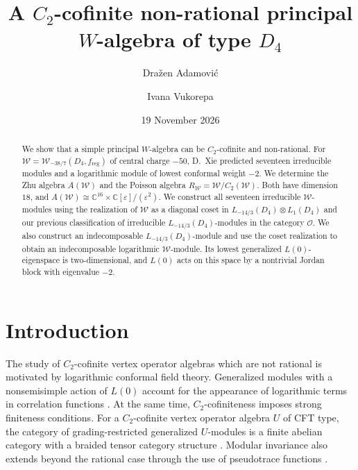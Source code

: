 \documentclass[11pt]{amsart}
\date{19 November 2026}
\title{A $C_2$-cofinite non-rational principal\\
 $W$-algebra of type $D_4$}
\author[]{Dra\v zen  Adamovi\' c}
\author[]{Ivana Vukorepa}
\numberwithin{equation}{section}
\theoremstyle{definition}
\theoremstyle{remark}
\newcommand{\CC}{\mathbb C}
\begin{document}
\begin{abstract}
We show that a simple principal $W$-algebra can be $C_2$-cofinite
and non-rational. For $\mathcal W=\mathcal W_{-38/7}(D_4,f_{\mathrm{reg}})$
of central charge $-50$, D.~Xie predicted seventeen irreducible modules
and a logarithmic module of lowest conformal weight $-2$.
We determine the Zhu algebra $A(\mathcal W)$ and the Poisson algebra
$R_{\mathcal W}=\mathcal W/C_2(\mathcal W)$. Both have dimension $18$,
and $A(\mathcal W)\cong\CC^{16}\times\CC[\varepsilon]/(\varepsilon^2)$.
We construct all seventeen irreducible $\mathcal W$-modules
using the realization of $\mathcal W$ as a diagonal coset in
$L_{-14/3}(D_4)\otimes L_1(D_4)$ and our previous classification of
irreducible $L_{-14/3}(D_4)$-modules in the category $\mathcal O$.
We also construct an indecomposable $L_{-14/3}(D_4)$-module and use
the coset realization to obtain an indecomposable logarithmic $\mathcal W$-module.
Its lowest generalized $L(0)$-eigenspace is two-dimensional, and $L(0)$ acts
on this space by a nontrivial Jordan block with eigenvalue $-2$.
\end{abstract}

 
\maketitle

\section{Introduction}


The study of $C_2$-cofinite vertex operator algebras which are
not rational is motivated by logarithmic conformal field
theory. Generalized modules with a nonsemisimple action of
$L(0)$ account for the appearance of logarithmic terms in
correlation functions \cite{Gur}. At the same time,
$C_2$-cofiniteness imposes strong finiteness conditions.
For a $C_2$-cofinite vertex operator algebra $U$ of CFT type, the category
of grading-restricted generalized $U$-modules is a finite abelian
category with a braided tensor category structure \cite{Hu}.
Modular invariance also extends beyond the rational case
through the use of pseudotrace functions \cite{Mi}.
\end{document}

